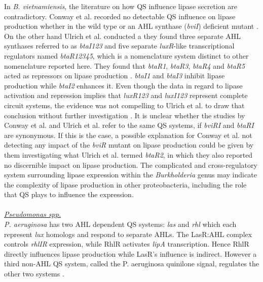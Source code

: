 \documentclass[11pt]{article}
\begin{document}
In \emph{B. vietnamiensis}, the literature on how QS influence lipase secretion are contradictory. Conway et al. recorded no detectable QS influence on lipase production whether in the wild type or an AHL synthase (\emph{bviI}) deficient mutant \cite{conway_02}. On the other hand Ulrich et al. conducted a they found three separate AHL synthases referred to as \emph{btaI123} and five separate \emph{luxR}-like transcriptional regulators named \emph{btaR12345}, which is a nomenclature system distinct to other nomenclature reported here. They found that \emph{btaR1}, \emph{btaR3}, \emph{btaR4} and \emph{btaR5} acted as repressors on lipase production \cite{ulrich2004}. \emph{btaI1} and \emph{btaI3} inhibit lipase production while \emph{btaI2} enhances it. Even though the data in regard to lipase activation and repression implies that \emph{luxR123} and \emph{luxI123} represent complete circuit systems, the evidence was not compelling to Ulrich et al. to draw that conclusion without further investigation \cite{ulrich2004}.
It is unclear whether the studies by Conway et al. and Ulrich et al. refer to the same QS systems, if \emph{bviRI} and \emph{btaRI} are synonymous. If this is the case, a possible explanation for Conway et al. not detecting any impact of the \emph{bviR} mutant on lipase production could be given by them investigating what Ulrich et al. termed \emph{btaR2}, in which they also reported no discernible impact on lipase production. 
The complicated and cross-regulatory system surrounding lipase expression within the \emph{Burkholderia} genus may indicate the complexity of lipase production in other proteobacteria, including the role that QS plays to influence the expression.
\\
\\ \emph{\underline{Pseudomonas spp.}}
\\ \emph{P. aeruginosa} has two AHL dependent QS systems: \emph{las} and \emph{rhl} which each represent \emph{lux} homologs and respond to separate AHLs. The LasR:AHL complex controls \emph{rhlIR} expression, while RhlR activates \emph{lipA} transcription. Hence RhlR directly influences lipase production while LasR's influence is indirect. However a third non-AHL QS system, called the P. aeruginosa quinilone signal, regulates the other two systems \cite{juhas2005}. 
\end{document}
